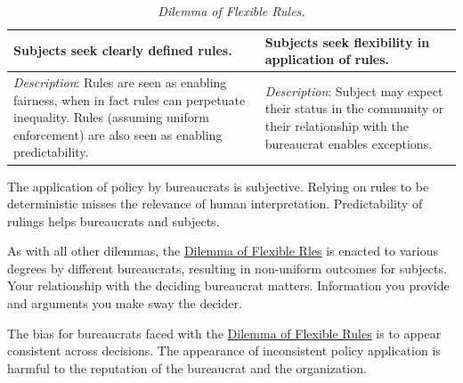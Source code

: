 \begin{center}
\begin{table}[H] %
\begin{tabular}{ | m{\dilemmatablewidth}| m{\dilemmatablewidth} | } 
  \hline
  \textbf{Subjects seek clearly defined rules.} &
  \textbf{Subjects seek flexibility in application of rules.} \\
  \hline
  \textit{Description}: Rules are seen as enabling fairness, when in fact rules can perpetuate inequality. Rules (assuming uniform enforcement) are also seen as enabling predictability. & 
  \textit{Description}: Subject may expect their status in the community or their relationship with the bureaucrat enables exceptions. \\
  \hline
\end{tabular}
\caption{\textit{Dilemma of Flexible Rules.}
}
\label{table:dilemma-subject-flexibility}
\end{table}
\end{center}

The application of policy by bureaucrats is subjective. Relying on rules to be deterministic misses the relevance of human interpretation. Predictability of rulings helps bureaucrats and subjects.

As with all other dilemmas, the \hyperref[table:dilemma-subject-flexibility]{Dilemma of Flexible Rles} is enacted to various degrees by different bureaucrats, resulting in non-uniform outcomes for subjects. Your relationship with the deciding bureaucrat matters. Information you provide and arguments you make sway the decider. 

The bias for bureaucrats faced with the \hyperref[table:dilemma-subject-flexibility]{Dilemma of Flexible Rules} is to appear consistent across decisions. The appearance of inconsistent policy application is harmful to the reputation of the bureaucrat and the organization.

